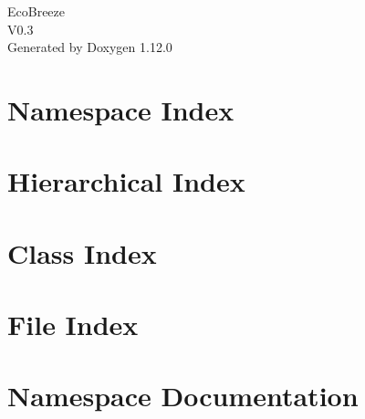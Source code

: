 \documentclass[twoside]{book}
\newcommand{\+}{\discretionary{\mbox{\scriptsize$\hookleftarrow$}}{}{}}
\newcommand{\clearemptydoublepage}{%
    \newpage{\pagestyle{empty}\cleardoublepage}%
  }
\begin{document}
  \raggedbottom
    \hypersetup{pageanchor=false,
                bookmarksnumbered=true,
                pdfencoding=unicode
               }
  \begin{titlepage}
  \vspace*{7cm}
  \begin{center}%
  {\Large Eco\+Breeze}\\
  [1ex]\large V0.\+3 \\
  \vspace*{1cm}
  {\large Generated by Doxygen 1.12.0}\\
  \end{center}
  \end{titlepage}
  \clearemptydoublepage
  \tableofcontents
  \clearemptydoublepage
  \hypersetup{pageanchor=true}
\chapter{Namespace Index}

\chapter{Hierarchical Index}

\chapter{Class Index}

\chapter{File Index}

\chapter{Namespace Documentation}








\end{document}
